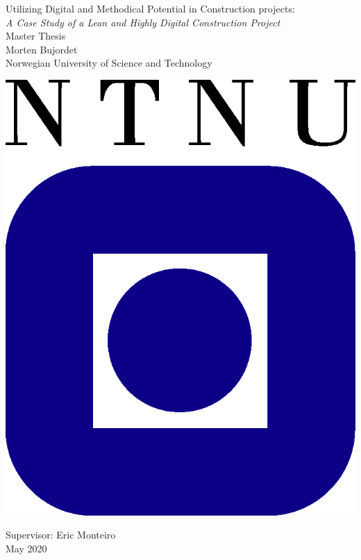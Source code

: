 \clearpage
\begin{titlepage}
    \begin{center}
    
        {\Huge Utilizing Digital and Methodical Potential in Construction projects:} \\{\Huge\textit{A Case Study of a Lean and Highly Digital Construction Project}} \\[0.4cm]
    
        {\Large Master Thesis} \\[2.0cm]
        {\Large Morten Bujordet} \\ [0.5cm]
        {\Large Norwegian University of Science and Technology}\\
    
        \vspace{3.0cm}
    
                \includegraphics{fig/ntnu-logo2.png}
    
        \vspace{3.0cm}
    
        {\Large Supervisor: Eric Monteiro} \\ [0.2cm]
        {\Large May 2020} \\[0.2cm]
    \end{center}
\end{titlepage}
\cleardoublepage